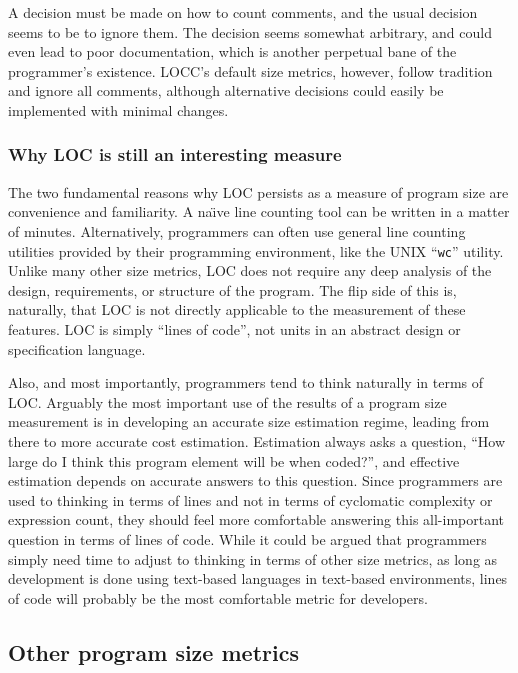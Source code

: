 A decision must be made on how to count comments, and the usual
decision \cite{Humphrey,Boehm,Grady} seems to be to ignore them.  The
decision seems somewhat arbitrary, and could even lead to poor
documentation, which is another perpetual bane of the programmer's
existence.  LOCC's default size metrics, however, follow tradition and
ignore all comments, although alternative decisions could easily be
implemented with minimal changes.

\subsubsection{Why LOC is still an interesting measure}
\label{why-loc}

The two fundamental reasons why LOC persists as a measure of program size
are convenience and familiarity.  A na\"{\i}ve line counting tool can be
written in a matter of minutes.  Alternatively, programmers can often use
general line counting utilities provided by their programming environment,
like the UNIX ``{\tt wc}'' utility\cite{wc}.  Unlike many other size
metrics, LOC does not require any deep analysis of the design,
requirements, or structure of the program.  The flip side of this is,
naturally, that LOC is not directly applicable to the measurement of these
features.  LOC is simply ``lines of code'', not units in an abstract design
or specification language.

Also, and most importantly, programmers tend to think
naturally in terms of LOC.  Arguably the most important use of the results
of a program size measurement is in developing an accurate size estimation
regime, leading from there to more accurate cost estimation.  Estimation
always asks a question, ``How large do I think this program element will be 
when coded?'', and effective estimation depends on accurate answers to this 
question.  Since programmers are used to thinking in terms of lines and not 
in terms of cyclomatic complexity or expression count, they should feel
more comfortable answering this all-important question in terms of lines of 
code.  While it could be argued that programmers simply need time to
adjust to thinking in terms of other size metrics, as long as development
is done using text-based languages in text-based environments, lines of
code will probably be the most comfortable metric for developers.

\subsection{Other program size metrics}

